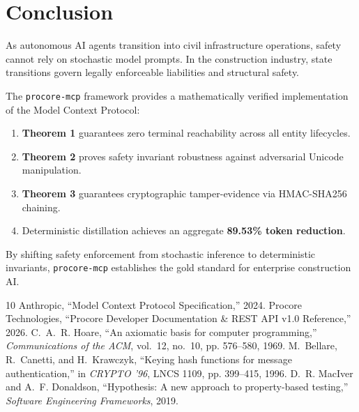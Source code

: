 \documentclass[10pt,conference,letterpaper]{article}
\begin{document}
\section{Conclusion}

As autonomous AI agents transition into civil infrastructure operations, safety cannot rely on stochastic model prompts. In the construction industry, state transitions govern legally enforceable liabilities and structural safety.

The \texttt{procore-mcp} framework provides a mathematically verified implementation of the Model Context Protocol:
\begin{enumerate}
    \item \textbf{Theorem 1} guarantees zero terminal reachability across all entity lifecycles.
    \item \textbf{Theorem 2} proves safety invariant robustness against adversarial Unicode manipulation.
    \item \textbf{Theorem 3} guarantees cryptographic tamper-evidence via HMAC-SHA256 chaining.
    \item Deterministic distillation achieves an aggregate \textbf{89.53\% token reduction}.
\end{enumerate}
By shifting safety enforcement from stochastic inference to deterministic invariants, \texttt{procore-mcp} establishes the gold standard for enterprise construction AI.


\begin{thebibliography}{10}
 Anthropic, ``Model Context Protocol Specification,'' 2024.
 Procore Technologies, ``Procore Developer Documentation \& REST API v1.0 Reference,'' 2026.
 C.~A.~R. Hoare, ``An axiomatic basis for computer programming,'' \emph{Communications of the ACM}, vol.~12, no.~10, pp. 576--580, 1969.
 M.~Bellare, R.~Canetti, and H.~Krawczyk, ``Keying hash functions for message authentication,'' in \emph{CRYPTO '96}, LNCS 1109, pp. 399--415, 1996.
 D.~R. MacIver and A.~F. Donaldson, ``Hypothesis: A new approach to property-based testing,'' \emph{Software Engineering Frameworks}, 2019.
\end{thebibliography}
\end{document}
